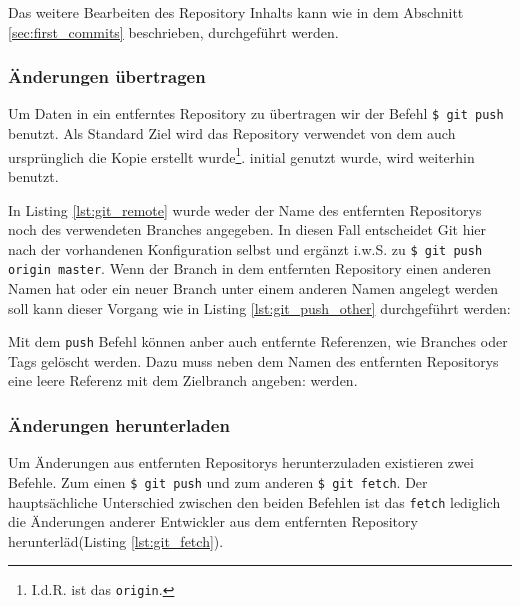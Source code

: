 Das weitere Bearbeiten des Repository Inhalts kann wie in dem Abschnitt
\ref{sec:first_commits} beschrieben, durchgeführt werden.

\subsubsection{Änderungen übertragen}
Um Daten in ein entferntes Repository zu übertragen wir der Befehl \texttt{\$
git push} benutzt. Als Standard Ziel wird das Repository verwendet von dem auch
ursprünglich die Kopie erstellt wurde\footnote{I.d.R. ist das \texttt{origin}.}.
initial genutzt wurde, wird weiterhin benutzt.



In Listing \ref{lst:git_remote} wurde weder der Name des entfernten Repositorys
noch des verwendeten Branches angegeben. In diesen Fall entscheidet Git hier
nach der vorhandenen Konfiguration selbst und ergänzt i.w.S. zu \texttt{\$ git
push origin master}. Wenn der Branch in dem entfernten Repository einen anderen
Namen hat oder ein neuer Branch unter einem anderen Namen angelegt werden soll
kann dieser Vorgang wie in Listing \ref{lst:git_push_other} durchgeführt werden:



Mit dem \texttt{push} Befehl können anber auch entfernte Referenzen, wie
Branches oder Tags gelöscht werden. Dazu muss neben dem Namen des entfernten
Repositorys eine leere Referenz mit dem Zielbranch angeben:
werden.\cite[S.~153-155]{gitosp}



\subsubsection{Änderungen herunterladen}
Um Änderungen aus entfernten Repositorys herunterzuladen existieren zwei
Befehle. Zum einen \texttt{\$ git push} und zum anderen \texttt{\$ git fetch}.
Der hauptsächliche Unterschied zwischen den beiden Befehlen ist das
\texttt{fetch} lediglich die Änderungen anderer Entwickler aus dem entfernten
Repository herunterläd(Listing \ref{lst:git_fetch}).



